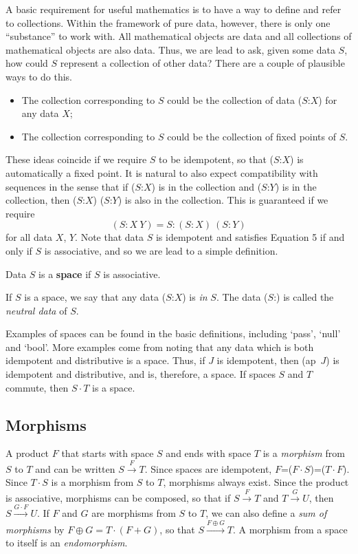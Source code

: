 \documentclass[11pt]{article}
\begin{document}
      A basic requirement for useful mathematics is to have a way to define and refer to collections.  
Within the framework of pure data, however, there is only one ``substance'' to work with.  All mathematical objects are data and 
all collections of mathematical objects are also data.  
Thus, we are lead to ask, given some data $S$, how could $S$ represent a collection of other data?  
There are a couple of plausible ways to do this.  
\begin{itemize} 
\item The collection corresponding to $S$ could be the collection of data ($S$:$X$) for any data $X$;
\item The collection corresponding to $S$ could be the collection of fixed points of $S$.  
\end{itemize}
These ideas coincide if we require $S$ to be idempotent, so that ($S$:$X$) is automatically a fixed point.  It is natural to also expect compatibility with 
sequences in the sense that if ($S$:$X$) is in the collection and ($S$:$Y$) is in the collection, then ($S$:$X$) ($S$:$Y$) is also in the collection.  
This is guaranteed if we require 
\begin{equation}
(S : X\ Y) = S : (S:X)\ (S:Y)
\end{equation}
for all data $X$, $Y$.  
Note that data $S$ is idempotent and satisfies Equation 5 if and only if $S$ is associative, and so we are lead 
to a simple definition.
\begin{definition} Data $S$ is a {\bf space} if $S$ is associative.
\end{definition}
\noindent If $S$ is a space, we say that any data ($S$:$X$) is {\it in} $S$.  
The data ($S$:) is called the {\it neutral data} of $S$.  

Examples of spaces can be found in the basic definitions, including `pass', `null' and `bool'.  More examples come from 
noting that any data which is both idempotent and distributive is a space.  Thus, if $J$ is idempotent, then (ap\ $J$) is idempotent and 
distributive, and is, therefore, a space.  If spaces $S$ and $T$ commute, then $S\cdot T$ is a space.    

\subsection{Morphisms} 

A product $F$ that starts with space $S$ and ends with space $T$ is a {\it morphism} from $S$ to $T$ and can be written $S{\overset F\longrightarrow}T$.
Since spaces are idempotent, $F$=($F\cdot S$)=($T\cdot F$).  Since $T\cdot S$ is a morphism from $S$ to $T$, morphisms always exist.  
Since the product is associative, morphisms can be composed, so that if $S{\overset F\longrightarrow}T$ and 
$T{\overset G\longrightarrow}U$, then $S{\overset {G\cdot F}\longrightarrow}U$.  
If $F$ and $G$ are morphisms from $S$ to $T$, we can also define a {\it sum of morphisms} by $F \oplus G = T\cdot (F+G)$, so that 
$S{\overset {F\oplus G}\longrightarrow}T$.  A morphism from a space to itself is an {\it endomorphism}. 
\end{document}
